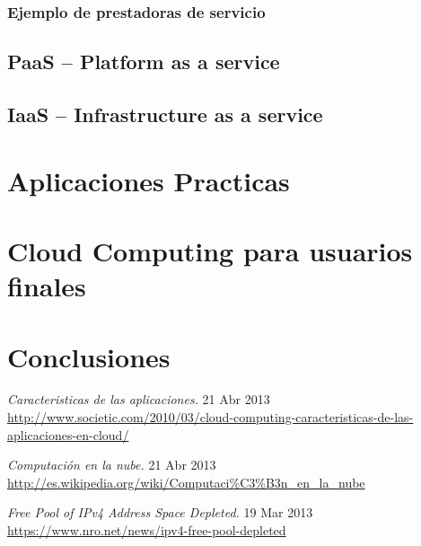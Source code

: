 \documentclass[12pt,a4paper]{article}
\begin{document}
\subsubsection{Ejemplo de prestadoras de servicio}

\subsection{PaaS -- Platform as a service}
\subsection{IaaS -- Infrastructure as a service}

\section{Aplicaciones Practicas}

\section{Cloud Computing para usuarios finales}

\section{Conclusiones}

\newpage

\begin{thebibliography}{1}

\emph{Caracteristicas de las aplicaciones. }
 21 Abr 2013\\
\url{http://www.societic.com/2010/03/cloud-computing-caracteristicas-de-las-
aplicaciones-en-cloud/}
 
\emph{Computación en la nube. } 
 21 Abr 2013\\
 \url{http://es.wikipedia.org/wiki/Computaci\%C3\%B3n_en_la_nube}
 
 \emph{Free Pool of IPv4 Address Space Depleted.} 
 19 Mar 2013\\
	\url{https://www.nro.net/news/ipv4-free-pool-depleted}	


\end{thebibliography}
\end{document}
